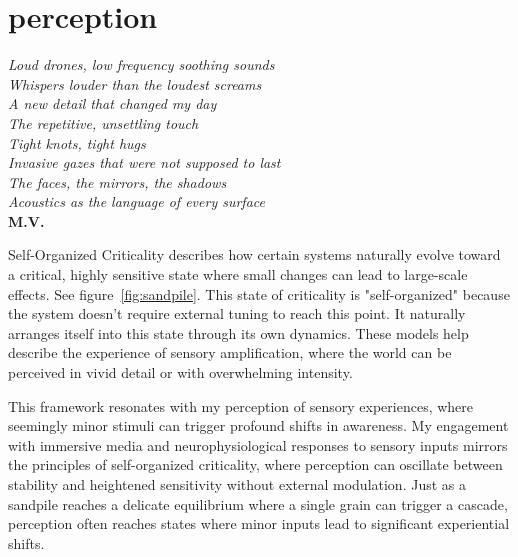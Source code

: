 \chapter*{perception}
\begin{center}
\vspace{2cm}
\begin{flushright}
\textit{Loud drones, low frequency soothing sounds\\Whispers louder than the loudest screams\\A new detail that changed my day\\The repetitive, unsettling touch\\Tight knots, tight hugs\\Invasive gazes that were not supposed to last\\The faces, the mirrors, the shadows\\Acoustics as the language of every surface}\\
\textbf{M.V.} 
\end{flushright}
\vspace{2cm}
\end{center}
\normalsize

\newpage  %
Self-Organized Criticality describes how certain systems naturally evolve toward a critical, highly sensitive state where small changes can lead to large-scale effects. See figure~\ref{fig:sandpile}. This state of criticality is "self-organized" because the system doesn't require external tuning to reach this point. It naturally arranges itself into this state through its own dynamics. These models help describe the experience of sensory amplification, where the world can be perceived in vivid detail or with overwhelming intensity. \citep{adami1993}

This framework resonates with my perception of sensory experiences, where seemingly minor stimuli can trigger profound shifts in awareness. My engagement with immersive media and neurophysiological responses to sensory inputs mirrors the principles of self-organized criticality, where perception can oscillate between stability and heightened sensitivity without external modulation. Just as a sandpile reaches a delicate equilibrium where a single grain can trigger a cascade, perception often reaches states where minor inputs lead to significant experiential shifts.

